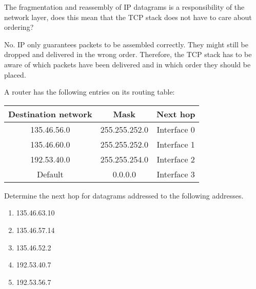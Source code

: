 \begin{Exercise}
The fragmentation and reassembly of IP datagrams is a responsibility of the network layer, does this mean that the TCP stack does not have to care about ordering?
\end{Exercise}
\begin{Answer}
No. IP only guarantees packets to be assembled correctly. They might still be dropped and delivered in the wrong order.
Therefore, the TCP stack has to be aware of which packets have been delivered and in which order they should be placed.
\end{Answer}

\begin{Exercise}
A router has the following entries on its routing table:

\begin{center}
\begin{tabular}{c|c|c}
    Destination network & Mask          & Next hop    \\ \hline
            135.46.56.0 & 255.255.252.0 & Interface 0 \\ \hline
            135.46.60.0 & 255.255.252.0 & Interface 1 \\ \hline
            192.53.40.0 & 255.255.254.0 & Interface 2 \\ \hline
            Default     &       0.0.0.0 & Interface 3
\end{tabular}
\end{center}

Determine the next hop for datagrams addressed to the following addresses.

\begin{enumerate}
\item 135.46.63.10
\item 135.46.57.14
\item 135.46.52.2
\item 192.53.40.7
\item 192.53.56.7
\end{enumerate}
\end{Exercise}
